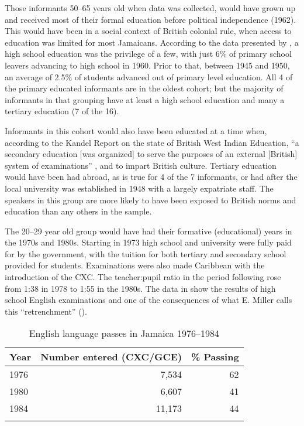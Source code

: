 Those informants 50--65 years old when data was collected, would have grown up and received most of their formal education before political independence (1962).  This would have been in a social context of British colonial rule, when access to education was limited for most Jamaicans.  According to the data presented by \citet[218]{Miller1989}, a high school education was the privilege of a few, with just 6\% of primary school leavers advancing to high school in 1960.  Prior to that, between 1945 and 1950, an average of 2.5\% of students advanced out of primary level education.  All 4 of the primary educated informants are in the oldest  cohort; but the majority of informants in that grouping have at least a high school education and many a tertiary education (7 of the 16).

  Informants in this  cohort would also have been educated at a time when, according to the Kandel Report on the state of British West Indian Education, “a secondary education [was organized] to serve the purposes of an external [British] system of examinations” \citep[462]{Williams1970}, and to impart British culture.  Tertiary education would have been had abroad, as is true for 4 of the 7 informants, or had after the local university was established in 1948 with a largely expatriate staff.  The speakers in this  group are more likely to have been exposed to British norms and education than any others in the  sample.  

  The 20--29 year old group would have had their formative (educational) years in the 1970s and 1980s.  Starting in 1973 high school and university were fully paid for by the government, with the tuition for both tertiary and secondary school provided for students.  Examinations were also made Caribbean with the introduction of the CXC.  The teacher:pupil ratio in the period following rose from 1:38 in 1978 to 1:55 in the 1980s.  The data in  show the results of high school English examinations and one of the consequences of what E. Miller calls this “retrenchment” (\citeyear[214]{Miller1989}).\largerpage[1]

\begin{table}[h]
\begin{tabular}{lrr}
\lsptoprule
Year         &   Number entered (CXC\slash GCE)     &     \% Passing   \\\midrule    
1976         &      7,534      &     62\\
1980         &      6,607      &     41\\
1984         &     11,173      &     44\\\lspbottomrule
\end{tabular}
\caption{English language passes in Jamaica 1976--1984}
\label{tab:3.48}
\end{table}

